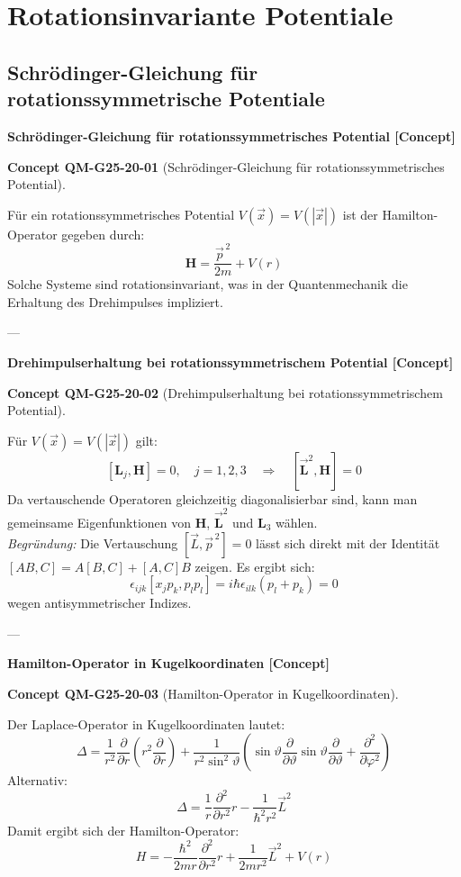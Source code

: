 \documentclass[10pt, letterpaper]{article}
\newcommand{\CustomHeading}[3]{%
  \par\medskip\noindent%
  \textbf{#1 #2} \textnormal{(#3)}.\enskip%
}
\newenvironment{CONC}[2]{\begin{unitbox}\CustomHeading{Concept}{#1}{#2}}{\end{unitbox}}
\begin{document}
\pagebreak






\section{Rotationsinvariante Potentiale}


\subsection{Schrödinger-Gleichung für rotationssymmetrische
Potentiale}


\textbf{Schrödinger-Gleichung für rotationssymmetrisches Potential [Concept]}

\begin{CONC}{QM-G25-20-01}{Schrödinger-Gleichung für rotationssymmetrisches Potential}
Für ein rotationssymmetrisches Potential $V(\vec{x}) = V(|\vec{x}|)$ ist der Hamilton-Operator gegeben durch:
\[
\mathbf{H} = \frac{\vec{p}^{\,2}}{2m} + V(r)
\]
Solche Systeme sind rotationsinvariant, was in der Quantenmechanik die Erhaltung des Drehimpulses impliziert.
\end{CONC}

---

\textbf{Drehimpulserhaltung bei rotationssymmetrischem Potential [Concept]}

\begin{CONC}{QM-G25-20-02}{Drehimpulserhaltung bei rotationssymmetrischem Potential}
Für $V(\vec{x}) = V(|\vec{x}|)$ gilt:
\[
[\mathbf{L}_j, \mathbf{H}] = 0, \quad j=1,2,3 \quad \Rightarrow \quad [\vec{\mathbf{L}}^2, \mathbf{H}] = 0
\]
Da vertauschende Operatoren gleichzeitig diagonalisierbar sind, kann man gemeinsame Eigenfunktionen von $\mathbf{H}$, $\vec{\mathbf{L}}^2$ und $\mathbf{L}_3$ wählen.\\

\textit{Begründung:} Die Vertauschung $[\vec{L}, \vec{p}^{\,2}] = 0$ lässt sich direkt mit der Identität $[AB, C] = A[B,C] + [A,C]B$ zeigen. Es ergibt sich:
\[
\epsilon_{ijk}[x_j p_k, p_l p_l] = i \hbar \epsilon_{ilk}(p_l + p_k) = 0
\]
wegen antisymmetrischer Indizes.
\end{CONC}

---

\textbf{Hamilton-Operator in Kugelkoordinaten [Concept]}

\begin{CONC}{QM-G25-20-03}{Hamilton-Operator in Kugelkoordinaten}
Der Laplace-Operator in Kugelkoordinaten lautet:
\[
\Delta = \frac{1}{r^2} \frac{\partial}{\partial r} \left( r^2 \frac{\partial}{\partial r} \right) + \frac{1}{r^2 \sin^2 \vartheta} \left( \sin \vartheta \frac{\partial}{\partial \vartheta} \sin \vartheta \frac{\partial}{\partial \vartheta} + \frac{\partial^2}{\partial \varphi^2} \right)
\]
Alternativ:
\[
\Delta = \frac{1}{r} \frac{\partial^2}{\partial r^2} r - \frac{1}{\hbar^2 r^2} \vec{L}^2
\]
Damit ergibt sich der Hamilton-Operator:
\[
H = -\frac{\hbar^2}{2m r} \frac{\partial^2}{\partial r^2} r + \frac{1}{2 m r^2} \vec{L}^2 + V(r)
\]
\end{CONC}
\end{document}
